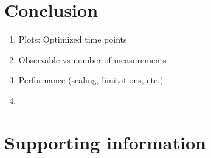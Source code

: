 \documentclass[10pt,A4paper]{article}
\begin{document}
\section*{Conclusion}
\begin{enumerate}
    \item Plots: Optimized time points
    \item Observable vs number of measurements
    \item Performance (scaling, limitations, etc.)
    \item 
\end{enumerate}
%
%
%
\section*{Supporting information}
%
%
%
\nolinenumbers

\end{document}

